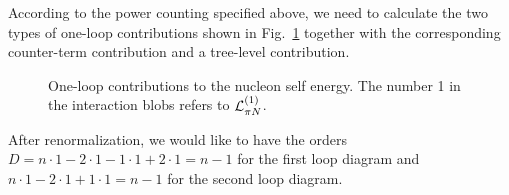 \documentclass[twoside,12pt]{article}
\begin{document}
   According to the power counting specified above, we need to calculate the two types of
one-loop contributions shown in Fig.\ \ref{4:2:3:SEDia} together with the
corresponding counter-term contribution and a tree-level contribution.
\begin{figure}[t]
\begin{center}
\caption{\label{4:2:3:SEDia}
One-loop contributions to the nucleon self energy. The
number 1 in the interaction blobs refers to ${\cal L}_{\pi
N}^{(1)}$.}
\end{center}\end{figure}
   After renormalization, we would like
to have the orders $D=n\cdot 1-2\cdot 1-1\cdot 1+2\cdot 1=n-1$ for the first loop diagram and
$n\cdot 1-2\cdot 1+1\cdot 1=n-1$ for the second loop diagram.
\end{document}
